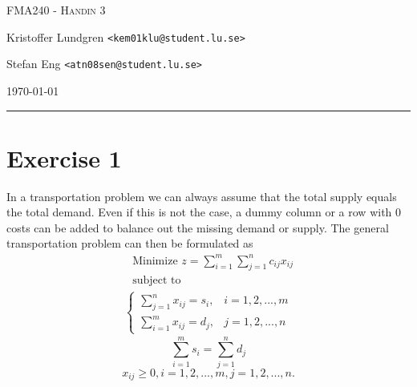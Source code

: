 \documentclass{article}
\begin{document}
\newcommand{\q}{\textbf{\huge{\textcolor{red}{?}}}}



\begin{centering}
	{\scshape\Large FMA240 - Handin 3\par}
	\vspace{0.5cm}
	Kristoffer Lundgren \texttt{<kem01klu@student.lu.se>}\par
	Stefan Eng \texttt{<atn08sen@student.lu.se>}\par
    \vspace{0.5cm}
	\today\par
    \rule{\textwidth}{0.4pt}
\end{centering}

\section*{Exercise 1}
  In a transportation problem we can always assume that the total supply equals
  the total demand. Even if this is not the case, a dummy column or a row with
  0 costs can be added to balance out the missing demand or supply.
  The general transportation problem can then be formulated as
  \begin{align*}
  & \text{Minimize } z = \sum_{i=1}^{m}\sum_{j=1}^n c_{ij}x_{ij} \\
  & \text{subject to}
    \label{eq1}
  \end{align*}
  \begin{align}
    \begin{cases}
      \sum_{j=1}^{n} x_{ij} = s_{i}, & i = 1, 2, ..., m \\
      \sum_{i=1}^{m} x_{ij} = d_{j}, & j = 1, 2, ..., n
    \end{cases}
  \end{align}
  \begin{equation}
    \sum_{i=1}^{m} s_{i} = \sum_{j=1}^n d_{j}
    \label{eq3}
  \end{equation}
  \begin{equation}
    x_{ij} \geq 0, i = 1, 2, ..., m, j = 1, 2, ..., n.
    \label{eq4}
  \end{equation}
\end{document}
